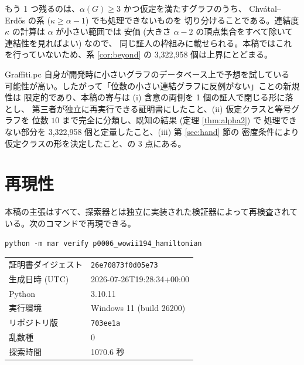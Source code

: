 \documentclass[paper=a4,fontsize=10.5pt,jafontsize=10.5pt]{jlreq}
\theoremstyle{plain}
\theoremstyle{definition}
\begin{document}
もう 1 つ残るのは、$\alpha(G) \ge 3$ かつ仮定を満たすグラフのうち、
Chvátal--Erdős の系 ($\kappa \ge \alpha - 1$) でも処理できないものを
切り分けることである。連結度 $\kappa$ の計算は $\alpha$ が小さい範囲では
安価 (大きさ $\alpha - 2$ の頂点集合をすべて除いて連結性を見ればよい) なので、
同じ証人の枠組みに載せられる。本稿ではこれを行っていないため、系
\ref{cor:beyond} の 3,322,958 個は上界にとどまる。

Graffiti.pc 自身が開発時に小さいグラフのデータベース上で予想を試している
可能性が高い。したがって「位数の小さい連結グラフに反例がない」ことの新規性は
限定的であり、本稿の寄与は (i) 含意の両側を 1 個の証人で閉じる形に落とし、
第三者が独立に再実行できる証明書にしたこと、(ii) 仮定クラスと等号グラフを
位数 $10$ まで完全に分類し、既知の結果 (定理 \ref{thm:alpha2}) で
処理できない部分を 3,322,958 個と定量したこと、(iii) 第 \ref{sec:hand} 節の
密度条件により仮定クラスの形を決定したこと、の 3 点にある。


\section*{再現性}
本稿の主張はすべて、探索器とは独立に実装された検証器によって再検査されている。次のコマンドで再現できる。

\begin{center}\texttt{python -m mar verify p0006\_wowii194\_hamiltonian}\end{center}

\begin{center}\begin{tabular}{ll}\toprule
証明書ダイジェスト & \texttt{26e70873f0d05e73} \\
生成日時 (UTC) & 2026-07-26T19:28:34+00:00 \\
Python & 3.10.11 \\
実行環境 & Windows 11 (build 26200) \\
リポジトリ版 & \texttt{703ee1a} \\
乱数種 & 0 \\
探索時間 & 1070.6 秒 \\
\bottomrule\end{tabular}\end{center}
\end{document}
